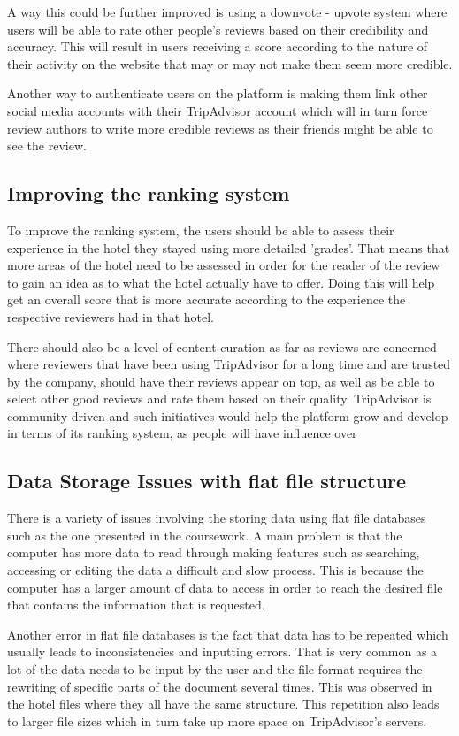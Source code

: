 \documentclass[titlepage]{article}
\begin{document}
            A way this could be further improved is using a downvote - upvote system where  users will be able to rate other people's reviews based on their credibility and accuracy. This will result in users receiving a score according to the nature of their activity on the website that may or may not make them seem more credible.
            
            Another way to authenticate users on the platform is making them link other social media accounts with their TripAdvisor account which will in turn force review authors to write more credible reviews as their friends might be able to see the review.
            
            \subsection{Improving the ranking system}
            
            To improve the ranking system, the users should be able to assess their experience in the hotel they stayed using more detailed 'grades'. That means that more areas of the hotel need to be assessed in order for the reader of the review to gain an idea as to what the hotel actually have to offer. Doing this will help get an overall score that is more accurate according to the experience the respective reviewers had in that hotel.
            
            There should also be a level of content curation as far as reviews are concerned where reviewers that have been using TripAdvisor for a long time and are trusted by the company, should have their reviews appear on top, as well as be able to select other good reviews and rate them based on their quality. TripAdvisor is community driven and such initiatives would help the platform grow and develop in terms of its ranking system, as people will have influence over 
            
            
            \subsection{Data Storage Issues with flat file structure}
           There is a variety of issues involving the storing data using flat file databases such as the one presented in the coursework. A main problem is that the computer has more data to read through  making features such as searching, accessing or editing the data a difficult and slow process. This is because the computer has a larger amount of data to access in order to reach the desired file that contains the information that is requested.
           
           Another error in flat file databases is the fact that data has to be repeated which usually leads to inconsistencies and inputting errors. That is very common as a lot of the data needs to be input by the user and the file format requires the rewriting of specific parts of the document several times. This was observed in the hotel files where they all have the same structure. This repetition also leads to larger file sizes which in turn take up more space on TripAdvisor's servers.
\end{document}
